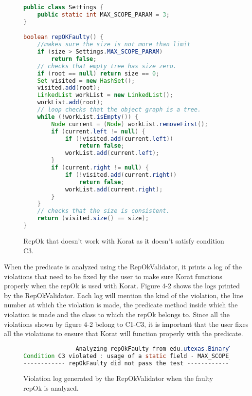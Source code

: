 \begin{figure}
\centering
\begin{lstlisting}[language=Java]
public class Settings {
    public static int MAX_SCOPE_PARAM = 3;
}

boolean repOKFaulty() {
    //makes sure the size is not more than limit
    if (size > Settings.MAX_SCOPE_PARAM) 
        return false;
    // checks that empty tree has size zero.
    if (root == null) return size == 0;
    Set visited = new HashSet();
    visited.add(root);
    LinkedList workList = new LinkedList();
    workList.add(root);
    // loop checks that the object graph is a tree.
    while (!workList.isEmpty()) {
        Node current = (Node) workList.removeFirst();
        if (current.left != null) {
            if (!visited.add(current.left))
                return false;
            workList.add(current.left);
        }
        if (current.right != null) {
            if (!visited.add(current.right))
                return false;
            workList.add(current.right);
        }
    }
    // checks that the size is consistent.
    return (visited.size() == size);
}

\end{lstlisting}
\caption{RepOk that doesn’t work with Korat as it doesn’t satisfy condition C3.}
\label{fig:repOkKoratSatisfyCorrectness}
\end{figure}

\par
When the predicate is analyzed using the RepOkValidator, it prints a log of the violations that need to be fixed by the user to make sure Korat functions properly when the repOk is used with Korat. Figure 4-2 shows the logs printed by the RepOkValidator. Each log will mention the kind of the violation, the line number at which the violation is made, the predicate method inside which the violation is made and the class to which the repOk belongs to. Since all the violations shown by figure 4-2 belong to C1-C3, it is important that the user fixes all the violations to ensure that Korat will function properly with the predicate.

\begin{figure}
\centering
\begin{lstlisting}[language=Java]
-------------- Analyzing repOkFaulty from edu.utexas.BinaryTree ------------
Condition C3 violated : usage of a static field - MAX_SCOPE_PARAM from class edu.utexas.BinaryTree$Settings at line 54 inside repOKEfficient in edu.utexas.BinaryTree
------------ repOkFaulty did not pass the test ------------
\end{lstlisting}
\caption{Violation log generated by the RepOkValidator when the faulty repOk is analyzed.}
\label{fig:repOkKoratSatisfyCorrectnessLog}
\end{figure}

